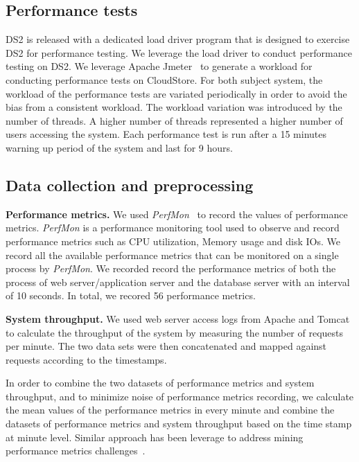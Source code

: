 \subsection{Performance tests}

DS2 is released with a dedicated load driver program that is designed to exercise DS2 for performance testing. We leverage the load driver to conduct performance testing on DS2. We leverage Apache Jmeter~\cite{apachejmeter} to generate a workload for conducting performance tests on CloudStore. For both subject system, the workload of the performance tests are variated periodically in order to avoid the bias from a consistent workload. The workload variation was introduced by the number of threads. A higher number of threads represented a higher number of users accessing the system. Each performance test is run after a 15 minutes warning up period of the system and last for 9 hours. 





\subsection{Data collection and preprocessing}

\noindent \textbf{Performance metrics.} We used \textit{PerfMon}~\cite{perfmon} to record the values of performance metrics. \textit{PerfMon} is a performance monitoring tool used to observe and record performance metrics such as CPU utilization, Memory usage and disk IOs. We record all the available performance metrics that can be monitored on a single process by \emph{PerfMon}.  We recorded record the performance metrics of both the process of web server/application server and the database server with an interval of 10 seconds. In total, we recored 56 performance metrics. 

\noindent \textbf{System throughput.} We used web server access logs from Apache and Tomcat to calculate the throughput of the system by measuring the number of requests per minute. The two data sets were then concatenated and mapped against requests according to the timestamps.

In order to combine the two datasets of performance metrics and system throughput, and to minimize noise of performance metrics recording, we calculate the mean values of the performance metrics in every minute and combine the datasets of performance metrics and system throughput based on the time stamp at minute level. Similar approach has been leverage to address mining performance metrics challenges~\cite{fooqsic}.
